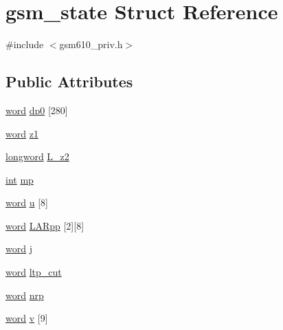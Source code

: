 \hypertarget{structgsm__state}{}\section{gsm\+\_\+state Struct Reference}
\label{structgsm__state}


{\ttfamily \#include $<$gsm610\+\_\+priv.\+h$>$}

\subsection*{Public Attributes}
\begin{DoxyCompactItemize}
\item 
\hyperlink{gsm610__priv_8h_a0b023cbb2bf7d034c2269d58d7455ac8}{word} \hyperlink{structgsm__state_ae5b267e1ae2a30ddfdfe940f32d14949}{dp0} \mbox{[}280\mbox{]}
\item 
\hyperlink{gsm610__priv_8h_a0b023cbb2bf7d034c2269d58d7455ac8}{word} \hyperlink{structgsm__state_aa893fbc493fffa33f0fc19950647cfa6}{z1}
\item 
\hyperlink{gsm610__priv_8h_a1f59e5e4587116bf95fb654f2a95712e}{longword} \hyperlink{structgsm__state_a8c0db6b1ec993de5385c90843b921eee}{L\+\_\+z2}
\item 
\hyperlink{xmltok_8h_a5a0d4a5641ce434f1d23533f2b2e6653}{int} \hyperlink{structgsm__state_a564b1f8742453a87c8cfb0cad7b8f213}{mp}
\item 
\hyperlink{gsm610__priv_8h_a0b023cbb2bf7d034c2269d58d7455ac8}{word} \hyperlink{structgsm__state_ad6c57d87a63556ac2e397312cc73135e}{u} \mbox{[}8\mbox{]}
\item 
\hyperlink{gsm610__priv_8h_a0b023cbb2bf7d034c2269d58d7455ac8}{word} \hyperlink{structgsm__state_a115c4dbf9aa013debd32634e3320a06f}{L\+A\+Rpp} \mbox{[}2\mbox{]}\mbox{[}8\mbox{]}
\item 
\hyperlink{gsm610__priv_8h_a0b023cbb2bf7d034c2269d58d7455ac8}{word} \hyperlink{structgsm__state_ab65015688378559ca4a31a8b56888e29}{j}
\item 
\hyperlink{gsm610__priv_8h_a0b023cbb2bf7d034c2269d58d7455ac8}{word} \hyperlink{structgsm__state_a49af42d73207ea1dfe1dc9fb117e60d1}{ltp\+\_\+cut}
\item 
\hyperlink{gsm610__priv_8h_a0b023cbb2bf7d034c2269d58d7455ac8}{word} \hyperlink{structgsm__state_a4e458d0429f05487e7986942703b4e34}{nrp}
\item 
\hyperlink{gsm610__priv_8h_a0b023cbb2bf7d034c2269d58d7455ac8}{word} \hyperlink{structgsm__state_a0e47cfb760e2c6da550ff07ca9e32b38}{v} \mbox{[}9\mbox{]}

\end{DoxyCompactItemize}
